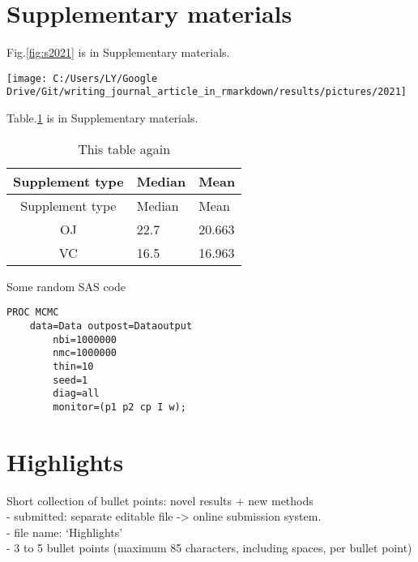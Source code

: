 \documentclass[review]{elsarticle} %
\let\origfigure\figure
\let\endorigfigure\endfigure
\renewenvironment{figure}[1][2] {
    \expandafter\origfigure\expandafter[H]
} {
    \endorigfigure
}
\begin{document}
\newpage

\renewcommand{\thefigure}{S\arabic{figure}}

\setcounter{figure}{0} \renewcommand{\thetable}{S\arabic{table}}
\setcounter{table}{0} \renewcommand{\theequation}{S\arabic{equation}}
\setcounter{equation}{0}

\section*{Supplementary materials}\label{appendix}

Fig.\ref{fig:s2021} is in Supplementary materials.

\begin{figure}

{\centering \texttt{[image: C:/Users/LY/Google Drive/Git/writing\_journal\_article\_in\_rmarkdown/results/pictures/2021]} 

}

\caption{A plot in Supplementary Materials}\label{fig:s2021}
\end{figure}

Table.\ref{tab:stable} is in Supplementary materials.

\begin{longtable}[]{@{}cll@{}}
\caption{\label{tab:unnamed-chunk-11}\label{tab:stable}This table
again}\tabularnewline
\toprule
Supplement type & Median & Mean\tabularnewline
\midrule
\endfirsthead
\toprule
Supplement type & Median & Mean\tabularnewline
\midrule
\endhead
OJ & 22.7 & 20.663\tabularnewline
VC & 16.5 & 16.963\tabularnewline
\bottomrule
\end{longtable}

Some random SAS code

\begin{verbatim}
PROC MCMC 
    data=Data outpost=Dataoutput 
        nbi=1000000 
        nmc=1000000
        thin=10
        seed=1
        diag=all
        monitor=(p1 p2 cp I w); 
\end{verbatim}

\newpage

\section*{Highlights}\label{highlight}

Short collection of bullet points: novel results + new methods\\
- submitted: separate editable file -\textgreater{} online submission
system.\\
- file name: `Highlights'\\
- 3 to 5 bullet points (maximum 85 characters, including spaces, per
bullet point)
\end{document}
